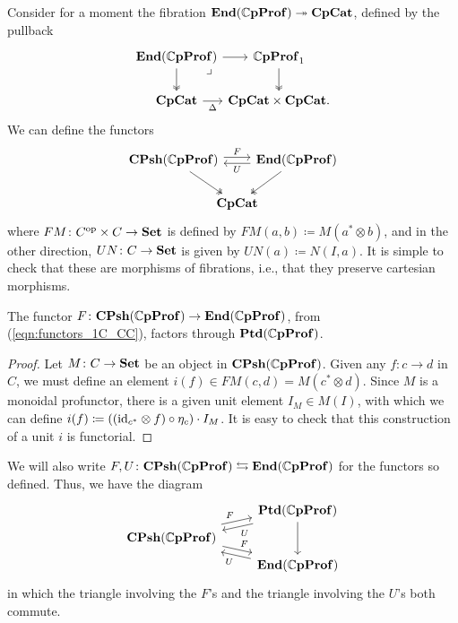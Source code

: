 \documentclass[11pt,oneside,article]{memoir}
\begin{document}
Consider for a moment the fibration $\mathbf{End}(\mathbb{C}\mathbf{pProf})\twoheadrightarrow\mathbf{CpCat}$, defined by the pullback
\[ \begin{tikzcd}[column sep=0em]
   \End(\dCompProf) \ar[d,two heads] \ar[r] \ar[dr,phantom,"\lrcorner" very near start]
      & \dCompProf_1 \ar[d,two heads] \\
   \CompCat \ar[r,"\Delta"']
      & \CompCat\times\CompCat.
\end{tikzcd} \]
We can define the functors
\begin{equation} \begin{tikzcd}[column sep=-1em]
   \label{eqn:functors_1C_CC}
   \CPsh(\dCompProf) \ar[rr,shift left,"F"] \ar[dr,two heads]
   && \End(\dCompProf) \ar[ll,shift left,"U"] \ar[dl,two heads] \\
   & \CompCat &
\end{tikzcd} \end{equation}
where $FM\colon{C}^{\text{op}}\times C\to\mathbf{Set}$ is defined by $FM(a,b)\coloneqq M(a^*\otimes b)$, and in the
other direction, $UN\colon C\to\mathbf{Set}$ is given by $UN(a)\coloneqq N(I,a)$. It is simple to check
that these are morphisms of fibrations, i.e., that they preserve cartesian morphisms.

\begin{proposition}
      \label{Prop:canonical unit}
   The functor $F\colon\mathbf{CPsh}(\mathbb{C}\mathbf{pProf})\to\mathbf{End}(\mathbb{C}\mathbf{pProf})$, from (\ref{eqn:functors_1C_CC}),
   factors through $\mathbf{Ptd}(\mathbb{C}\mathbf{pProf})$.
\end{proposition}
\begin{proof}
   Let $M\colon C\to\mathbf{Set}$ be an object in $\mathbf{CPsh}(\mathbb{C}\mathbf{pProf})$. Given any $f\colon c\to d$ in $ C$,
   we must define an element $i(f)\in FM(c,d)=M(c^*\otimes d)$. Since $M$ is a monoidal profunctor,
   there is a given unit element $I_M\in M(I)$, with which we can define $i(f)\coloneqq((\mathrm{id}_{c^*}\otimes
   f)\circ\eta_c)\cdot I_M$. It is easy to check that this construction of a unit $i$ is functorial.
\end{proof}

We will also write $F,U\colon\mathbf{CPsh}(\mathbb{C}\mathbf{pProf})\leftrightarrows\mathbf{End}(\mathbb{C}\mathbf{pProf})$ for the functors so
defined. Thus, we have the diagram
\begin{equation} \begin{tikzcd}[row sep=tiny]
      \label{eqn:ptd_functors_1C_CC}
   & \Ptd(\dCompProf) \ar[dd] \ar[dl,shift left,"U"] \\
   \CPsh(\dCompProf) \ar[ur,shift left,"F"] \ar[dr,shift left,"F"] & \\
   & \End(\dCompProf) \ar[ul,shift left,"U"]
\end{tikzcd} \end{equation}
in which the triangle involving the $F$'s and the triangle involving the $U$'s both commute.
\end{document}
